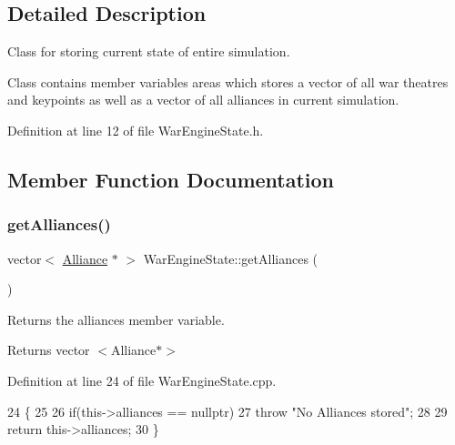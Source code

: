 \subsection{Detailed Description}
Class for storing current state of entire simulation. 

Class contains member variables areas which stores a vector of all war theatres and keypoints as well as a vector of all alliances in current simulation. 

Definition at line 12 of file War\+Engine\+State.\+h.



\subsection{Member Function Documentation}
\mbox{\label{classWarEngineState_aa88851d165886c80521e93c2d74338d5}} 
\subsubsection{\texorpdfstring{get\+Alliances()}{getAlliances()}}
{\footnotesize\ttfamily vector$<$ \hyperlink{classAlliance}{Alliance} $\ast$ $>$ War\+Engine\+State\+::get\+Alliances (\begin{DoxyParamCaption}{ }\end{DoxyParamCaption})}



Returns the alliances member variable. 

\begin{DoxyReturn}{Returns}
vector $<$Alliance$\ast$$>$ 
\end{DoxyReturn}


Definition at line 24 of file War\+Engine\+State.\+cpp.


\begin{DoxyCode}
24                                                \{
25 
26     \textcolor{keywordflow}{if}(this->alliances == \textcolor{keyword}{nullptr})
27     \textcolor{keywordflow}{throw} \textcolor{stringliteral}{"No Alliances stored"};
28 
29     \textcolor{keywordflow}{return} this->alliances;
30 \}
\end{DoxyCode}
\mbox{\label{classWarEngineState_a9f6f2aef902096c80a0014ff5466915c}} 
